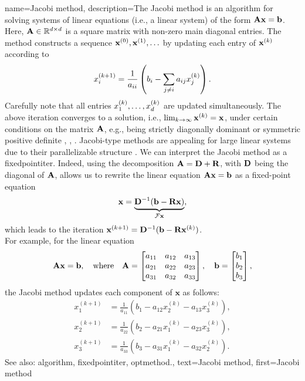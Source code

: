 {name={Jacobi method},
	description={The Jacobi method is an \gls{algorithm}  
		for solving systems of linear equations (i.e., a linear system) of the form ${\bf A}{\bf x}= \mathbf{b}$.  
		Here, ${\bf A} \in \mathbb{R}^{d \times d}$ is a square matrix with 
		non-zero main diagonal entries. The method constructs a sequence ${\bf x}^{(0)},{\bf x}^{(1)},\ldots$ 
		by updating each entry of $\mathbf{x}^{(k)}$ according to 
		\[
		x_i^{(k+1)} = \frac{1}{a_{ii}} \left( b_i - \sum_{j \neq i} a_{ij} x_j^{(k)} \right).
		\]
		Carefully note that all entries $x^{(k)}_{1},\ldots,x^{(k)}_{d}$ are updated simultaneously.
		The above iteration converges to a solution, i.e., $\lim_{k \rightarrow \infty} {\bf x}^{(k)}={\bf x}$, 
		under certain conditions on the matrix ${\bf A}$, e.g., being strictly 
		diagonally dominant or symmetric positive  definite \cite{GolubVanLoanBook}, \cite{Horn91}, \cite{StrangLinAlg2016}. 
		Jacobi-type methods are appealing for large linear systems due to their parallelizable structure \cite{ParallelDistrBook}.
		We can interpret the Jacobi method as a \gls{fixedpointiter}. Indeed, using the decomposition ${\bf A} = {\bf D} + {\bf R}$, with ${\bf D}$ being the 
		diagonal of ${\bf A}$, allows us to rewrite the linear equation ${\bf A} {\bf x} = {\bf b}$ as a fixed-point equation  
		\[
		\mathbf{x} = \underbrace{{\bf D}^{-1}(\mathbf{b} - {\bf R} \mathbf{x})}_{\mathcal{F} {\bf x}},
		\]
		which leads to the iteration ${\bf x}^{(k+1)} = {\bf D}^{-1}(\mathbf{b} - {\bf R} {\bf x}^{(k)})$.
		\\
		For example, for the linear equation 
		 \[
		 {\bf A} \mathbf{x} = \mathbf{b}, \quad \text{where} \quad
		 {\bf A} = \begin{bmatrix}
		 	a_{11} & a_{12} & a_{13} \\
		 	a_{21} & a_{22} & a_{23} \\
		 	a_{31} & a_{32} & a_{33}
		 \end{bmatrix}, \quad
		 \mathbf{b} = \begin{bmatrix}
		 	b_1 \\
		 	b_2 \\
		 	b_3
		 \end{bmatrix},
		 \]
		 the Jacobi method updates each component of \( \mathbf{x} \) as follows:
		 \[
		 \begin{aligned}
		 	x_1^{(k+1)} &= \frac{1}{a_{11}} \left( b_1 - a_{12} x_2^{(k)} - a_{13} x_3^{(k)} \right), \\
		 	x_2^{(k+1)} &= \frac{1}{a_{22}} \left( b_2 - a_{21} x_1^{(k)} - a_{23} x_3^{(k)} \right), \\
		 	x_3^{(k+1)} &= \frac{1}{a_{33}} \left( b_3 - a_{31} x_1^{(k)} - a_{32} x_2^{(k)} \right).
		 \end{aligned}
		 \]
		See also: \gls{algorithm}, \gls{fixedpointiter}, \gls{optmethod}.},
	text={Jacobi method}, 
	first={Jacobi method}
}
	
